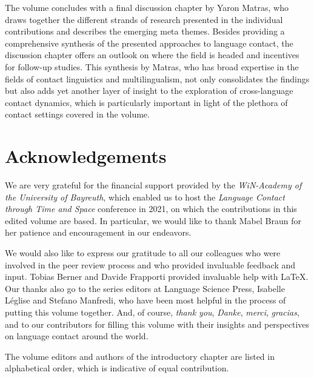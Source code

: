 \documentclass[output=paper
		  ]{langscibook}
\begin{document}
The volume concludes with a final discussion chapter by Yaron Matras, who draws together the different strands of research presented in the individual contributions and describes the emerging meta themes. Besides providing a comprehensive synthesis of the presented approaches to language contact, the discussion chapter offers an outlook on where the field is headed and incentives for follow-up studies. This synthesis by Matras, who has broad expertise in the fields of contact linguistics and multilingualism, not only consolidates the findings but also adds yet another layer of insight to the exploration of cross-language contact dynamics, which is particularly important in light of the plethora of contact settings covered in the volume. 

\section*{Acknowledgements}

We are very grateful for the financial support provided by the \textit{WiN-Academy of the University of Bayreuth}, which enabled us to host the \textit{Language Contact through Time and Space} conference in 2021, on which the contributions in this edited volume are based. In particular, we would like to thank Mabel Braun for her patience and encouragement in our endeavors.
 
We would also like to express our gratitude to all our colleagues who were involved in the peer review process and who provided invaluable feedback and input. Tobias Berner and Davide Frapporti provided invaluable help with LaTeX. Our thanks also go to the series editors at Language Science Press, Isabelle Léglise and Stefano Manfredi, who have been most helpful in the process of putting this volume together. And, of course, \textit{thank you}, \textit{Danke}, \textit{merci}, \textit{gracias}, and  to our contributors for filling this volume with their insights and perspectives on language contact around the world.

The volume editors and authors of the introductory chapter are listed in alphabetical order, which is indicative of equal contribution.

\printbibliography[heading=subbibliography, notkeyword=this]
\end{document}
